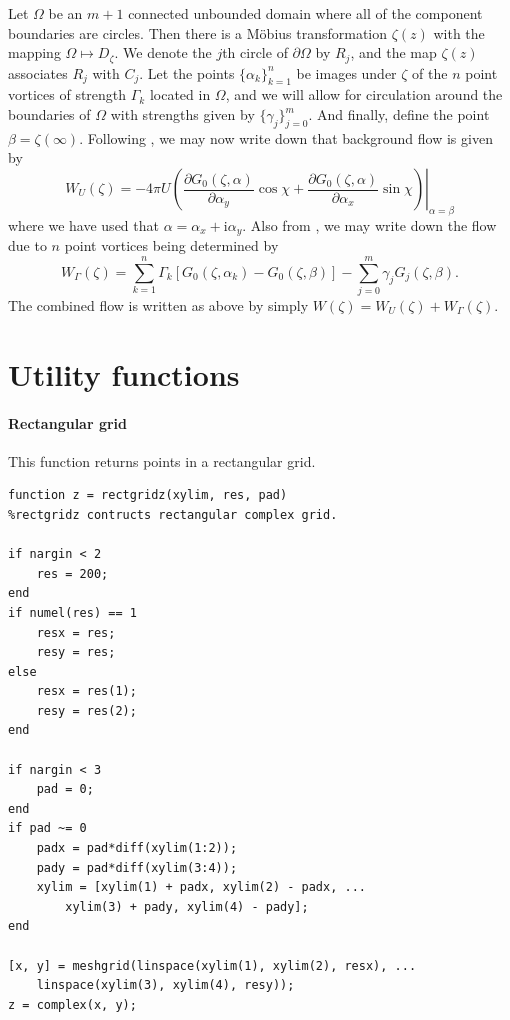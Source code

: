 \documentclass[12pt,fleqn]{article}
\renewcommand{\i}{\mathrm{i}}
\begin{document}
Let $\Omega$ be an $m+1$ connected unbounded domain where all of the component boundaries are circles. Then there is a M\"obius transformation $\zeta(z)$ with the mapping $\Omega\mapsto D_\zeta$. We denote the $j$th circle of $\partial\Omega$ by $R_j$, and the map $\zeta(z)$ associates $R_j$ with $C_j$. Let the points $\{\alpha_k\}_{k=1}^n$ be images under $\zeta$ of the $n$ point vortices of strength $\Gamma_k$ located in $\Omega$, and we will allow for circulation around the boundaries of $\Omega$ with strengths given by $\{\gamma_j\}_{j=0}^m$. And finally, define the point $\beta = \zeta(\infty)$. Following \cite{newcalculus}, we may now write down that background flow is given by
\begin{equation}
  W_U(\zeta) = -4\pi U\left. \left( \frac{\partial G_0(\zeta,\alpha)}{\partial \alpha_y}\cos\chi + \frac{\partial G_0(\zeta,\alpha)}{\partial \alpha_x}\sin\chi \right) \right|_{\alpha = \beta}
  \label{eq:backgroudmc}
\end{equation}
where we have used that $\alpha = \alpha_x + \i\alpha_y$. Also from \cite{newcalculus}, we may write down the flow due to $n$ point vortices being determined by
\begin{equation}
  W_\Gamma(\zeta) = \sum_{k=1}^n \Gamma_k \left[ G_0(\zeta,\alpha_k) - G_0(\zeta,\beta) \right] - \sum_{j=0}^m \gamma_j G_j(\zeta,\beta).
  \label{eq:vorticesmc}
\end{equation}
The combined flow is written as above by simply $W(\zeta) = W_U(\zeta) + W_\Gamma(\zeta)$.





\clearpage
\appendix

\section{Utility functions}
\paragraph{Rectangular grid}
This function returns points in a rectangular grid.
\begin{lstlisting}
function z = rectgridz(xylim, res, pad)
%rectgridz contructs rectangular complex grid.

if nargin < 2
    res = 200;
end
if numel(res) == 1
    resx = res;
    resy = res;
else
    resx = res(1);
    resy = res(2);
end

if nargin < 3
    pad = 0;
end
if pad ~= 0
    padx = pad*diff(xylim(1:2));
    pady = pad*diff(xylim(3:4));
    xylim = [xylim(1) + padx, xylim(2) - padx, ...
        xylim(3) + pady, xylim(4) - pady];
end

[x, y] = meshgrid(linspace(xylim(1), xylim(2), resx), ...
    linspace(xylim(3), xylim(4), resy));
z = complex(x, y);
\end{lstlisting}
\end{document}
